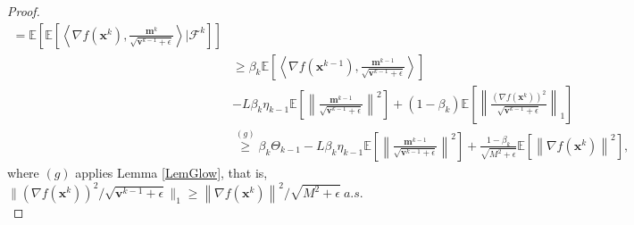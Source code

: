\documentclass[twoside,11pt]{article}
\begin{document}
\begin{proof}
\begin{equation}
\begin{aligned}
   	=\mathbb{E}\left[\mathbb{E}\left[ \left\langle \nabla f(\mathbf{x}^k),\frac{\mathbf{m}^k}{\sqrt{\mathbf{v}^{k-1}+\epsilon}}\right\rangle\bigg|\mathcal{F}^k\right]\right]\\
   	&\ge\beta_k\mathbb{E}\left[\left\langle \nabla f(\mathbf{x}^{k-1}),\frac{ \mathbf{m}^{k-1}}{\sqrt{\mathbf{v}^{k-1}+\epsilon}}\right\rangle\right]
   	\\
   	&
   	-L\beta_k \eta_{k-1}\mathbb{E}\left[\left\| \frac{ \mathbf{m}^{k-1}}{\sqrt{\mathbf{v}^{k-1}+\epsilon}}\right\|^2\right] 
   	+(1-\beta_k)\mathbb{E}\left[\left\| \frac{(\nabla f(\mathbf{x}^k))^2 }{\sqrt{\mathbf{v}^{k-1}+\epsilon}}\right\|_1\right] \\
   	&\overset{(g)}{\ge}
   	\beta_k\Theta_{k-1}
   	-L\beta_k \eta_{k-1}\mathbb{E}\left[\left\| \frac{ \mathbf{m}^{k-1}}{\sqrt{\mathbf{v}^{k-1}+\epsilon}}\right\|^2\right] 
   	+\frac{1-\beta_k}{\sqrt{M^2+\epsilon}}\mathbb{E}\left[\left\| \nabla f(\mathbf{x}^k)\right\|^2\right] ,
   	\end{aligned}
\end{equation}
where $(g)$ applies Lemma \ref{LemGlow},  that is, 
$\|{(\nabla f(\mathbf{x}^k))^2}/{\sqrt{\mathbf{v}^{k-1}+\epsilon}}\|_1  \ge {\left\|  \nabla f(\mathbf{x}^k)\right\|^2}/{\sqrt{M^2+\epsilon}}\ a.s.$\\
   	

\end{proof}
\end{document}

